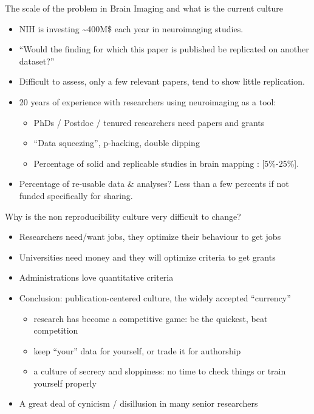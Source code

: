 \documentclass[ignorenonframetext,]{beamer}
\begin{document}
\begin{frame}{The scale of the problem in Brain Imaging and what is the
current culture}

\begin{itemize}[<+->]
\itemsep1pt\parskip0pt
\item
  NIH is investing \textasciitilde{}400M\$ each year in neuroimaging
  studies.
\item
  ``Would the finding for which this paper is published be replicated on
  another dataset?''
\item
  Difficult to assess, only a few relevant papers, tend to show little
  replication.
\item
  20 years of experience with researchers using neuroimaging as a tool:

  \begin{itemize}[<+->]
  \itemsep1pt\parskip0pt
  \item
    PhDs / Postdoc / tenured researchers need papers and grants
  \item
    ``Data squeezing'', p-hacking, double dipping
  \item
    Percentage of solid and replicable studies in brain mapping :
    {[}5\%-25\%{]}.
  \end{itemize}
\item
  Percentage of re-usable data \& analyses? Less than a few percents if
  not funded specifically for sharing.
\end{itemize}

\end{frame}

\begin{frame}{Why is the non reproducibility culture very difficult to
change?}

\begin{itemize}[<+->]
\itemsep1pt\parskip0pt
\item
  Researchers need/want jobs, they optimize their behaviour to get jobs
\item
  Universities need money and they will optimize criteria to get grants
\item
  Administrations love quantitative criteria
\item
  Conclusion: publication-centered culture, the widely accepted
  ``currency''

  \begin{itemize}[<+->]
  \itemsep1pt\parskip0pt
  \item
    research has become a competitive game: be the quickest, beat
    competition
  \item
    keep ``your'' data for yourself, or trade it for authorship
  \item
    a culture of secrecy and sloppiness: no time to check things or
    train yourself properly
  \end{itemize}
\item
  A great deal of cynicism / disillusion in many senior researchers
\end{itemize}

\end{frame}
\end{document}
